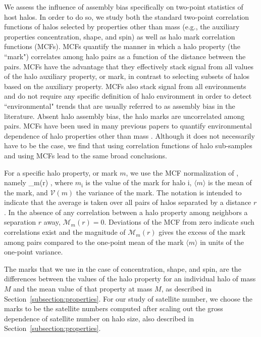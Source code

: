 \documentclass[usenatbib]{mnras}
\begin{document}
We assess the influence of assembly bias specifically on two-point statistics of host halos. In order to do so, we 
study both the standard two-point correlation functions of halos selected by properties other than mass 
(e.g., the auxiliary properties concentration, shape, and spin) as well as halo mark correlation functions
(MCFs). MCFs quantify the manner in which a halo property (the ``mark") correlates among halo pairs as a function
of the distance between the pairs. MCFs have the advantage that they effectively stack signal from all values of 
the halo auxiliary property, or mark, in contrast to selecting subsets of halos based on the auxiliary property. 
MCFs also stack signal from all environments and do not require any specific definition of halo environment in 
order to detect ``environmental" trends that are usually referred to as assembly bias in the literature. 
Absent halo assembly bias, the halo marks are uncorrelated among pairs. 
MCFs have been used in many previous papers to quantify environmental dependence of halo 
properties other than mass \citep{sheth_tormen04,sheth05, harker_etal06,wechsler_etal06,mao_etal15}. 
Although it does not necessarily have to be the case, we find that using correlation functions of halo sub-samples 
and using MCFs lead to the same broad conclusions. 


For a specific halo property, or mark $m$, we use the MCF normalization of \citet{wechsler_etal06}, namely 
%
\beq
{}_m(r) \equiv {},
\eeq
%
where $m_{\mathrm{i}}$ is the value of the mark for halo $\mathrm{i}$, $\langle m \rangle$ is the mean of the
mark, and $\mathcal{V}(m)$ the variance of the mark. The notation is intended to indicate that the average is
taken over all pairs of halos separated by a distance $r$. In the absence of any correlation between a halo
property among neighbors a separation $r$ away, $\mathcal{M}_m(r) = 0$. Deviations of the MCF from
zero indicate such correlations exist and the magnitude of $\mathcal{M}_m(r)$ gives the excess of the mark among
pairs compared to the one-point mean of the mark $\langle m\rangle$ in units of the one-point variance. 

The marks that we use in the case of concentration, shape, and spin, are the differences between 
the values of the halo property for an individual halo of mass $M$ and the mean 
value of that property at mass $M$, as described in Section~\ref{subsection:properties}. 
For our study of satellite number, we choose the marks to be the satellite numbers 
computed after scaling out the gross dependence of satellite number on halo size, 
also described in Section~\ref{subsection:properties}. 
\end{document}
